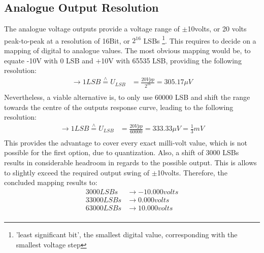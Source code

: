 		\subsection{Analogue Output Resolution}
		The analogue voltage outputs provide a voltage range of $\pm$10volts, or 20 volts peak-to-peak at a resolution of 16Bit, or $2^{16}$ LSBs \footnote{'least significant bit', the smallest digital value, corresponding with the smallest voltage step}. This requires to decide on a mapping of digital to analogue values. The most obvious mapping would be, to equate -10V with 0 LSB and +10V with 65535 LSB, providing the following resolution:
		\begin{align*}
			\rightarrow 1 LSB \overset{\wedge}{=} U_{LSB} &= \frac{20Vpp}{2^{16}} = 305.17 \mu V \\
		\end{align*}
		Nevertheless, a viable alternative is, to only use 60000 LSB and shift the range towards the centre of the outputs response curve, leading to the following resolution:
		\begin{align*}
			\rightarrow 1 LSB \overset{\wedge}{=} U_{LSB} &= \frac{20Vpp}{60000} = 333.33 \mu V = \frac{1}{3}mV \\
		\end{align*}
		This provides the advantage to cover every exact milli-volt value, which is not possible for the first option, due to quantization. Also, a shift of 3000 LSBs results in considerable headroom in regards to the possible output. This is allows to slightly exceed the required output swing of $\pm$10volts. Therefore, the concluded mapping results to:
		\begin{align*}
			3000LSBs	&\rightarrow -10.000 volts \\
			33000LSBs	&\rightarrow 0.000 volts \\
			63000LSBs	&\rightarrow	10.000 volts \\
		\end{align*}
